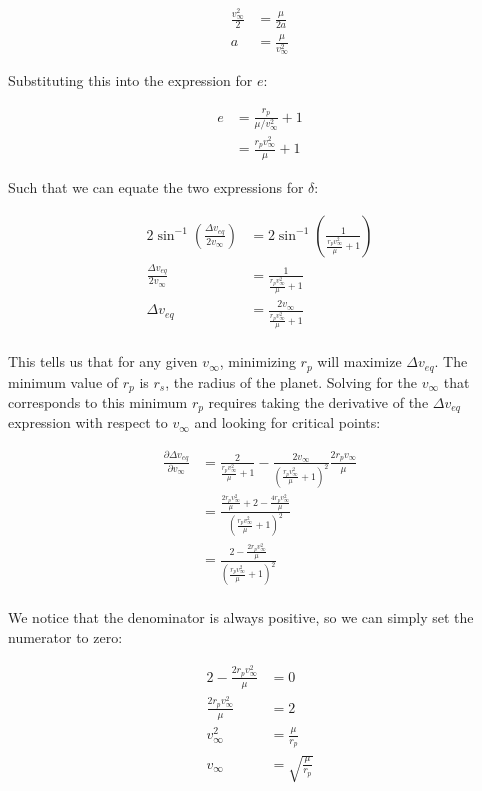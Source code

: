 \begin{align*}
    \frac{v_\infty^2}{2} &= \frac{\mu}{2a} \\
    a &= \frac{\mu}{v_\infty^2}
\end{align*}

Substituting this into the expression for $e$:

\begin{align*}
    e &= \frac{r_p}{\mu/v_\infty^2} + 1 \\
    &= \frac{r_p v_\infty^2}{\mu} + 1
\end{align*}

Such that we can equate the two expressions for $\delta$:

\begin{align*}
    2 \sin^{-1} \left( \frac{\Delta v_{eq}}{2 v_\infty} \right) &= 2 \sin^{-1} \left( \frac{1}{\frac{r_p v_\infty^2}{\mu} + 1} \right) \\
    \frac{\Delta v_{eq}}{2 v_\infty} &= \frac{1}{\frac{r_p v_\infty^2}{\mu} + 1} \\
    \Delta v_{eq} &= \frac{2 v_\infty}{\frac{r_p v_\infty^2}{\mu} + 1} \\
\end{align*}

This tells us that for any given $v_\infty$, minimizing $r_p$ will maximize $\Delta v_{eq}$. The minimum value of $r_p$ is $r_s$, the radius of the planet. Solving for the $v_\infty$ that corresponds to this minimum $r_p$ requires taking the derivative of the $\Delta v_{eq}$ expression with respect to $v_\infty$ and looking for critical points:

\begin{align*}
    \frac{\partial \Delta v_{eq}}{\partial v_\infty} &= \frac{2}{\frac{r_p v_\infty^2}{\mu} + 1} - \frac{2 v_\infty}{\left( \frac{r_p v_\infty^2}{\mu} + 1 \right)^2} \frac{2 r_p v_\infty}{\mu} \\
    &= \frac{\frac{2r_p v_\infty^2}{\mu} + 2 - \frac{4r_p v_\infty^2}{\mu}}{\left( \frac{r_p v_\infty^2}{\mu} + 1 \right)^2} \\
    &= \frac{2 - \frac{2r_p v_\infty^2}{\mu}}{\left( \frac{r_p v_\infty^2}{\mu} + 1 \right)^2} \\
\end{align*}

We notice that the denominator is always positive, so we can simply set the numerator to zero:

\begin{align*}
    2 - \frac{2r_p v_\infty^2}{\mu} &= 0 \\
    \frac{2r_p v_\infty^2}{\mu} &= 2 \\
    v_\infty^2 &= \frac{\mu}{r_p} \\
    v_\infty &= \sqrt{\frac{\mu}{r_p}}
\end{align*}

